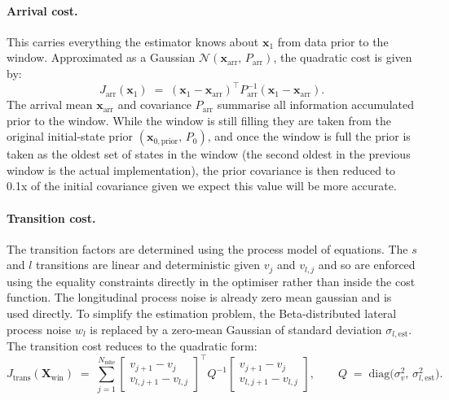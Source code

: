 \paragraph{Arrival cost.}
This carries everything the estimator knows about $\mathbf{x}_{1}$ from data prior to the window. Approximated as a Gaussian $\mathcal{N}(\mathbf{x}_{\text{arr}},\,P_{\text{arr}})$, the quadratic cost is given by:
\begin{equation}
    J_{\text{arr}}(\mathbf{x}_{1}) \;=\; (\mathbf{x}_{1} - \mathbf{x}_{\text{arr}})^{\top} P_{\text{arr}}^{-1} (\mathbf{x}_{1} - \mathbf{x}_{\text{arr}}).
    \label{eq:cost_arr}
\end{equation}
The arrival mean $\mathbf{x}_{\text{arr}}$ and covariance $P_{\text{arr}}$ summarise all information accumulated prior to the window. While the window is still filling they are taken from the original initial-state prior $(\mathbf{x}_{0,\text{prior}},\,P_{0})$, and once the window is full the prior is taken as the oldest set of states in the window (the second oldest in the previous window is the actual implementation), the prior covariance is then reduced to 0.1x of the initial covariance given we expect this value will be more accurate. 

\paragraph{Transition cost.}
The transition factors are determined using the process model of equations. The $s$ and $l$ transitions are linear and deterministic given $v_{j}$ and $v_{l,j}$ and so are enforced using the equality constraints directly in the optimiser rather than inside the cost function. The longitudinal process noise is already zero mean gaussian and is used directly. To simplify the estimation problem, the Beta-distributed lateral process noise $w_{l}$ is replaced by a zero-mean Gaussian of standard deviation $\sigma_{l,\text{est}}$. The transition cost reduces to the quadratic form:
\begin{equation}
    J_{\text{trans}}(\mathbf{X}_{\text{win}}) \;=\; \sum_{j=1}^{N_{\text{mhe}}}
        \begin{bmatrix} v_{j+1}-v_{j} \\ v_{l,j+1}-v_{l,j} \end{bmatrix}^{\top}
        Q^{-1}
        \begin{bmatrix} v_{j+1}-v_{j} \\ v_{l,j+1}-v_{l,j} \end{bmatrix},
    \qquad
    Q \;=\; \mathrm{diag}\!\bigl(\sigma_{v}^{2},\,\sigma_{l,\text{est}}^{2}\bigr).
    \label{eq:cost_trans}
\end{equation}

